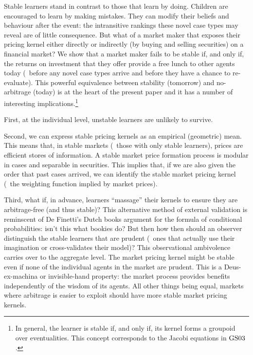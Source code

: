\documentclass[12pt,a4paper,twoside]{article}
\newcommand{\gsii}{$\textup{GS03}$}
\begin{document}
Stable learners stand in contrast to those that learn by doing. Children are
encouraged to learn by making mistakes. They can modify their beliefs and
behaviour after the event: the intransitive rankings these novel case types may
reveal are of little consequence.  But what of a market maker that exposes
their pricing kernel either directly or indirectly (by buying and selling
securities) on a financial market? We show that a market maker fails to be
stable if, and only if, the returns on investment that they offer provide a
free lunch to other agents today (\ie\ before any novel case types arrive and
before they have a chance to re-evaluate).  This powerful equivalence between
stability (tomorrow) and no-arbitrage (today) is at the heart of the present
paper and it has a number of interesting implications.\footnote{In general, the
learner is stable if, and only if, its kernel forms a groupoid over
eventualities. This concept corresponds to the Jacobi equations in \gsii.}

First, at the individual level, unstable learners are unlikely to survive.

Second, we can express stable pricing kernels as an empirical (geometric) mean.
This means that, in stable markets (\ie\ those with only stable learners),
prices are efficient stores of information. A stable market price formation
process is modular in cases and separable in securities. This implies that, if
we are also given the order that past cases arrived, we can identify the stable
market pricing kernel (\ie\ the weighting function implied by market prices).
 
Third, what if, in advance, learners ``massage'' their kernels to ensure they
are arbitrage-free (and thus stable)? This alternative method of external
validation is reminscent of De Finetti's Dutch books argument for the formula
of conditional probabilities: isn't this what bookies do?  But then how then
should an observer distinguish the stable learners that are prudent (\ie\ ones
that actually use their imagination or cross-validates their model)?  This
observational ambivolence carries over to the aggregate level.  The market
pricing kernel might be stable even if none of the individual agents in the
market are prudent.  This is a Deus-ex-machina or invisible-hand
property: the market process provides benefits independently of the wisdom of
its agents.  All other things being equal, markets where arbitrage is easier to
exploit should have more stable market pricing kernels.
 
\end{document}

